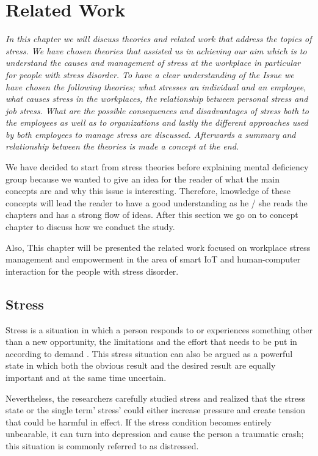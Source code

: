 \chapter{Related Work}
\textit{In  this  chapter  we  will  discuss  theories and related work  that  address  the  topics  of  stress.  We  have  chosen theories  that  assisted  us  in  achieving  our  aim  which  is  to  understand  the  causes  and management  of  stress  at  the  workplace  in  particular  for people with stress disorder.  To  have  a  clear understanding of the Issue we have chosen the following theories; what stresses an individual and  an  employee, what  causes  stress  in  the  workplaces,  the  relationship  between  personal stress and job stress. What are the possible consequences and disadvantages of stress both to the  employees  as  well  as  to  organizations  and  lastly  the  different  approaches used  by  both employees to  manage  stress  are  discussed.  Afterwards  a  summary  and relationship between the theories is made a concept at the end.}
\vspace{5mm}

We have  decided  to  start  from  stress theories before explaining mental deficiency group because  we  wanted  to give  an  idea  for  the  reader  of what the main concepts are  and why  this issue is interesting. Therefore, knowledge of these concepts will lead the reader to have a good understanding as he / she reads the chapters and has a strong flow of ideas.  After  this  section we  go  on  to concept chapter to discuss how we conduct the study.

Also, This chapter will be presented the related work focused on workplace stress management and empowerment in the area of smart \ac{IoT} and human-computer interaction for the people with stress disorder.
\section{Stress}
Stress is a situation in which a person responds to or experiences something other than a new opportunity, the limitations and the effort that needs to be put in according to demand \citep{Naturale2007SecondaryField} . This stress situation can also be argued as a powerful state in which both the obvious result and the desired result are equally important and at the same time uncertain.

Nevertheless, the researchers carefully studied stress and realized that the stress state or the single term' stress' could either increase pressure and create tension that could be harmful in effect. If the stress condition becomes entirely unbearable, it can turn into depression and cause the person a traumatic crash; this situation is commonly referred to as distressed. 

